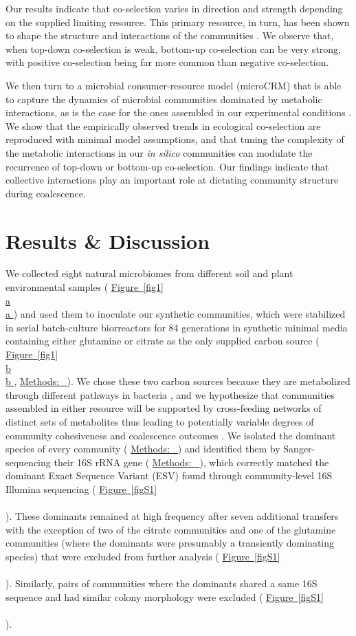 \documentclass[a4paper,10pt]{article}
\newcommand{\figref}[2][]{%
  \hyperref[{#2}]{%
    Figure~\ref*{#2}%
    \ifx\\#1\\%
    \else
      #1%
    \fi
  }%
}
\newcommand{\methodsref}[1]{%
  \hyperref[{methods:#1}]{%
   Methods:~\nameref*{methods:#1}%
  }%
}
\begin{document}
Our results indicate that co-selection varies in direction and strength depending on the supplied limiting
resource.
This primary resource, in turn, has been shown to
shape the structure and interactions of the communities \cite{Estrela2020}.
We observe that, when top-down co-selection is weak, bottom-up co-selection can be very strong,
with positive co-selection being far more common than negative co-selection.

We then turn to a microbial consumer-resource model (microCRM)
\cite{Goldford2018,Marsland2019,Marsland2020}
that is able to capture the dynamics of microbial communities dominated by metabolic interactions,
as is the case for the ones assembled in our experimental conditions \cite{Goldford2018,Estrela2020}.
We show that the empirically observed trends in ecological co-selection are reproduced
with minimal model assumptions, and that
tuning the complexity of the metabolic interactions in our \textit{in silico} communities can modulate
the recurrence of top-down or bottom-up co-selection.
Our findings indicate that collective interactions play an important role at dictating community structure
during coalescence.

\section*{Results \& Discussion}\label{results-discussion}

We collected eight natural microbiomes from different soil and plant environmental samples
(\figref[a]{fig1})
and used them to inoculate our synthetic communities, which were stabilized 
in serial batch-culture biorreactors for 84 generations in synthetic minimal media containing either
glutamine or citrate as the only supplied carbon source
(\figref[b]{fig1}, \methodsref{community-assembly}).
We chose these two carbon sources because they are metabolized through different
pathways in bacteria \cite{Dimroth2004,Forchhammer2007},
and we hypothesize that communities assembled in either resource will be supported by
cross-feeding networks of distinct sets of metabolites \cite{Goldford2018,Estrela2020}
thus leading to potentially variable degrees of community cohesiveness
and coalescence outcomes \cite{Tikhonov2016,Tikhonov2017,Castledine2020,Lechon2021}.
We isolated the dominant species of every community
(\methodsref{dominants})
and identified them by Sanger-sequencing their 16S rRNA gene
(\methodsref{sequencing}), which correctly matched the dominant
Exact Sequence Variant (ESV) \cite{Callahan2016,Callahan2017} found through
community-level 16S Illumina sequencing
(\figref{figS1}).
These dominants remained at high frequency after seven additional transfers
with the exception of two of the citrate communities and one of the glutamine
communities (where the dominants were presumably a transiently dominating species)
that were excluded from further analysis
(\figref{figS1}).
Similarly, pairs of communities where the dominants shared a same 16S sequence
and had similar colony morphology were excluded
(\figref{figS1}).
\end{document}
